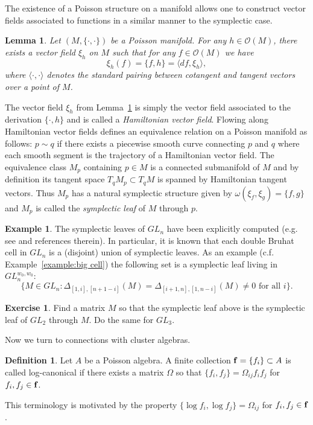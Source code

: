 \documentclass{amsart}
\newtheorem{lemma}[theorem]{Lemma}
\theoremstyle{definition}
\newtheorem{definition}[theorem]{Definition}
\newtheorem{example}[theorem]{Example}
\newtheorem{exercise}[theorem]{Exercise}
\theoremstyle{remark}
\numberwithin{equation}{section}
\newcommand{\cO}{{\mathcal{O}}}
\newcommand{\bff}{{\bf f}}
\begin{document}
  The existence of a Poisson structure on a manifold allows one to construct vector fields associated to functions in a similar manner to the symplectic case.
  \begin{lemma}\label{le:Hamiltonian vector fields}
    Let $(M,\{\cdot,\cdot\})$ be a Poisson manifold.  For any $h\in\cO(M)$, there exists a vector field $\xi_h$ on $M$ such that for any $f\in\cO(M)$ we have
    \[\xi_h(f)=\{f,h\}=\langle df,\xi_h\rangle,\]
    where $\langle\cdot,\cdot\rangle$ denotes the standard pairing between cotangent and tangent vectors over a point of $M$.
  \end{lemma}
  The vector field $\xi_h$ from Lemma~\ref{le:Hamiltonian vector fields} is simply the vector field associated to the derivation $\{\cdot,h\}$ and is called a \emph{Hamiltonian vector field}.  Flowing along Hamiltonian vector fields defines an equivalence relation on a Poisson manifold as follows: $p\sim q$ if there exists a piecewise smooth curve connecting $p$ and $q$ where each smooth segment is the trajectory of a Hamiltonian vector field.  The equivalence class $M_p$ containing $p\in M$ is a connected submanifold of $M$ and by definition its tangent space $T_qM_p\subset T_qM$ is spanned by Hamiltonian tangent vectors.  Thus $M_p$ has a natural symplectic structure given by $\omega(\xi_f,\xi_g)=\{f,g\}$ and $M_p$ is called the \emph{symplectic leaf} of $M$ through $p$.
  \begin{example}
    The symplectic leaves of $GL_n$ have been explicitly computed (e.g. see \cite{KZ02} and references therein).  In particular, it is known that each double Bruhat cell in $GL_n$ is a (disjoint) union of symplectic leaves.  As an example (c.f. Example~\ref{example:big cell}) the following set is a symplectic leaf living in $GL_n^{w_0,w_0}$:
    \[\{M\in GL_n:\Delta_{[1,i],[n+1-i]}(M)=\Delta_{[i+1,n],[1,n-i]}(M)\ne0\text{ for all $i$}\}.\]
  \end{example}
  \begin{exercise}
    Find a matrix $M$ so that the symplectic leaf above is the symplectic leaf of $GL_2$ through $M$.  Do the same for $GL_3$.
  \end{exercise}

  Now we turn to connections with cluster algebras.
  \begin{definition}
    Let $A$ be a Poisson algebra.  A finite collection $\bff=\{f_i\}\subset A$ is called log-canonical if there exists a matrix $\Omega$ so that $\{f_i,f_j\}=\Omega_{ij}f_if_j$ for $f_i,f_j\in\bff$.
  \end{definition}
  This terminology is motivated by the property $\{\log f_i,\log f_j\}=\Omega_{ij}$ for $f_i,f_j\in\bff$.
\end{document}
